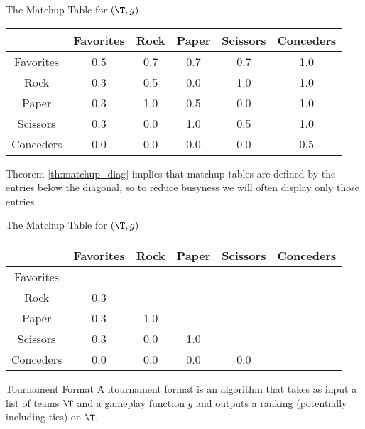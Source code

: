 {    \begin{figg}{The Matchup Table for $(\T, g)$}{}
        \begin{center}
            \begin{tabular}{ c | c c c c c}
            & Favorites & Rock & Paper & Scissors & Conceders\\
            \hline
            Favorites & 0.5 & 0.7 & 0.7 & 0.7 & 1.0\\
            Rock      & 0.3 & 0.5 & 0.0 & 1.0 & 1.0\\
            Paper     & 0.3 & 1.0 & 0.5 & 0.0 & 1.0\\
            Scissors  & 0.3 & 0.0 & 1.0 & 0.5 & 1.0\\
            Conceders & 0.0 & 0.0 & 0.0 & 0.0 & 0.5
            \end{tabular}
        \end{center}
    \end{figg}

    
    
    Theorem \ref{th:matchup_diag} implies that matchup tables are defined by the entries below the diagonal, so to reduce busyness we will often display only those entries.

    \begin{figg}{The Matchup Table for $(\T, g)$}{}
        \begin{center}
            \begin{tabular}{ c | c c c c c}
            & Favorites & Rock & Paper & Scissors & Conceders\\
            \hline
            Favorites & &  &  &  & \\
            Rock      & 0.3 & & &  & \\
            Paper     & 0.3 & 1.0 & & & \\
            Scissors  & 0.3 & 0.0 & 1.0 & & \\
            Conceders & 0.0 & 0.0 & 0.0 & 0.0 &
            \end{tabular}
        \end{center}
    \end{figg}

    \begin{definition}{Tournament Format}{}
        A \i{tournament format} is an algorithm that takes as input a list of teams $\T$ and a gameplay function $g$ and outputs a ranking (potentially including ties) on $\T.$
    \end{definition}

}
